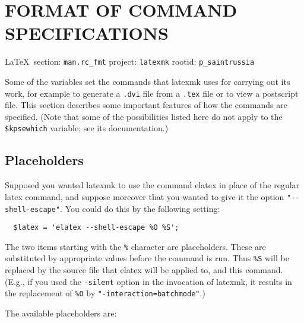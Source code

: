  
 

\section{FORMAT OF COMMAND SPECIFICATIONS}
  
\vspace{0.5cm}
 {\ifDEBUG\small\LaTeX~section: \verb|man.rc_fmt| project: \verb|latexmk| rootid: \verb|p_saintrussia| \fi}
\vspace{0.5cm}
  

Some of the variables set the commands that latexmk uses  for  carrying out
its  work, for example to generate a \verb|.dvi| file from a \verb|.tex| file
or to view a postscript file.  This section describes some important  features
of how the commands are specified.  (Note that some of the possibilities listed
here do not apply to the \verb|$kpsewhich| variable;  see  its documentation.)

\subsection{Placeholders}

Supposed you wanted latexmk to use the command elatex in place
of the regular latex  command,  and  suppose  moreover  that  you wanted  to
give  it the option \verb|"--shell-escape"|.  You could do this by the
following setting:

\begin{verbatim}
  $latex = 'elatex --shell-escape %O %S';
\end{verbatim}

The two items starting with the \verb|%| character  are  placeholders.   These
are  substituted by appropriate values before the command is run.  Thus
\verb|%S| will be replaced by the source file that elatex will be applied to,
and  %
this command.  (E.g., if you used the \verb|-silent| option in the invocation
of  latexmk,   it  results in the replacement of \verb|%O| by
\verb|"-interaction=batchmode"|.)

The available placeholders are:

